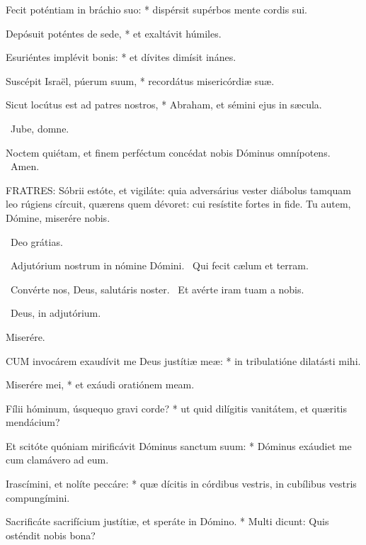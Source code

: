 Fecit poténtiam in bráchio suo: * dispérsit supérbos mente cordis sui.

Depósuit poténtes de sede, * et exaltávit húmiles.

Esuriéntes implévit bonis: * et dívites dimísit inánes.

Suscépit Israël, púerum suum, * recordátus misericórdiæ suæ.

Sicut locútus est ad patres nostros, * Abraham, et sémini ejus in sæcula.



\V\ Jube, domne.

 Noctem quiétam, et finem perféctum concédat nobis Dóminus omnípotens. \R\ Amen.


\lettrine[lines=2]{F}{RATRES}: Sóbrii estóte, et vigiláte: quia adversárius vester diábolus tamquam leo rúgiens círcuit, quærens quem dévoret: cui resístite fortes in fide. Tu autem, Dómine, miserére nobis.

\R\ Deo grátias.

\V\ Adjutórium nostrum in nómine Dómini. \R\ Qui fecit cælum et terram.



\V\ Convérte nos, Deus, salutáris noster. \R\ Et avérte iram tuam a nobis.

\V\ Deus, in adjutórium.

 Miserére.


\lettrine[lines=2]{C}{UM} invocárem exaudívit me Deus justítiæ meæ: * in tribulatióne dilatásti mihi.

Miserére mei, * et exáudi oratiónem meam.

Fílii hóminum, úsquequo gravi corde? * ut quid dilígitis vanitátem, et quæritis mendácium?

Et scitóte quóniam mirificávit Dóminus sanctum suum: * Dóminus exáudiet me cum clamávero ad eum.

Irascímini, et nolíte peccáre: * quæ dícitis in córdibus vestris, in cubílibus vestris compungímini.

Sacrificáte sacrifícium justítiæ, et speráte in Dómino. * Multi dicunt: Quis osténdit nobis bona?

